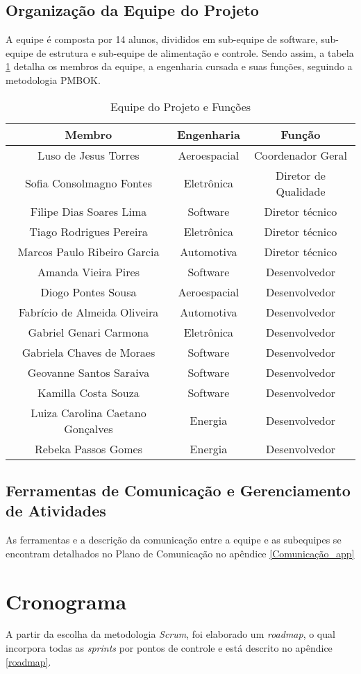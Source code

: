 \subsection{Organização da Equipe do Projeto}
A equipe é composta por 14 alunos, divididos em sub-equipe de software, sub-equipe de estrutura e sub-equipe de alimentação e controle. Sendo assim, a tabela \ref{tab:equipe} detalha os membros da equipe, a engenharia cursada e suas funções, seguindo a metodologia PMBOK.

\begin{table}[H]
\centering
\caption{Equipe do Projeto e Funções}
\label{tab:equipe}
\begin{tabular}{@{}|c|c|c|@{}}
\hline
\rowcolor[HTML]{A8DADC}
\textbf{Membro} & \textbf{Engenharia} & \textbf{Função} \\ \hline
Luso de Jesus Torres& Aeroespacial & Coordenador Geral \\ \hline
Sofia Consolmagno Fontes & Eletrônica & Diretor de Qualidade \\ \hline
Filipe Dias Soares Lima & Software & Diretor técnico \\ \hline
Tiago Rodrigues Pereira & Eletrônica & Diretor técnico \\ \hline
Marcos Paulo Ribeiro Garcia & Automotiva & Diretor técnico \\ \hline
Amanda Vieira Pires & Software & Desenvolvedor \\ \hline
Diogo Pontes Sousa & Aeroespacial & Desenvolvedor \\ \hline
Fabrício de Almeida Oliveira & Automotiva & Desenvolvedor \\ \hline
Gabriel Genari Carmona & Eletrônica & Desenvolvedor \\ \hline
Gabriela Chaves de Moraes & Software & Desenvolvedor \\ \hline
Geovanne Santos Saraiva & Software & Desenvolvedor \\ \hline
Kamilla Costa Souza & Software & Desenvolvedor \\ \hline
Luiza Carolina Caetano Gonçalves & Energia & Desenvolvedor \\ \hline
Rebeka Passos Gomes & Energia & Desenvolvedor \\ \hline
\end{tabular}
\end{table}

\subsection{Ferramentas de Comunicação e Gerenciamento de Atividades}

As ferramentas e a descrição da comunicação entre a equipe e as subequipes se encontram detalhados no Plano de Comunicação no apêndice \ref{Comunicação_app}

\section{Cronograma}
A partir da escolha da metodologia \textit{Scrum}, foi elaborado um \textit{roadmap}, o qual incorpora todas as \textit{sprints} por pontos de controle e está descrito no apêndice \ref{roadmap}.


